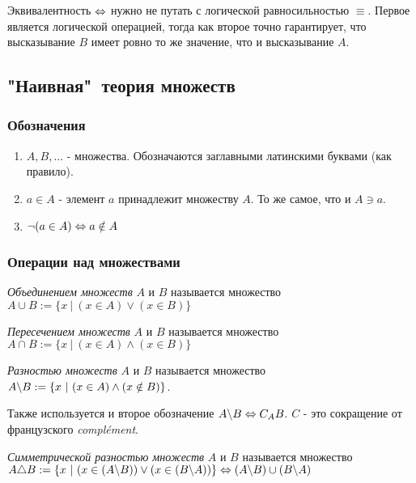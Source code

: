 Эквивалентность $\Leftrightarrow$ нужно не путать с логической равносильностью $\equiv$. Первое является логической операцией, тогда как второе точно гарантирует, что высказывание $B$ имеет ровно то же значение, что и высказывание $A$.


\subsection{"Наивная"\ теория множеств}

\subsubsection*{Обозначения}

\begin{enumerate}
    \item $A, B, \dots$ - множества. Обозначаются заглавными латинскими буквами (как правило).
    \item $a \in A$ - элемент $a$ принадлежит множеству $A$. То же самое, что и $A \ni a$.
    \item $\neg (a \in A) \Leftrightarrow a \notin A$
\end{enumerate}


\subsubsection*{Операции над множествами}

\begin{definition}
    \textit{Объединением множеств} $A$ и $B$ называется множество $A \cup B := \{x\ |\ (x \in A) \vee (x \in B)\}$
\end{definition}

\begin{definition}
    \textit{Пересечением множеств} $A$ и $B$ называется множество $A \cap B := \{x\ |\ (x \in A) \wedge (x \in B)\}$
\end{definition}

\begin{definition}
    \textit{Разностью множеств} $A$ и $B$ называется множество $A \backslash B := \{x\ |\ (x \in A) \wedge (x \notin B)\}$.
    
    Также используется и второе обозначение $A \backslash B \Leftrightarrow C_A B$. $C$ - это сокращение от французского \textit{complément}.
\end{definition}

\begin{definition}
    \textit{Симметрической разностью множеств} $A$ и $B$ называется множество $A \triangle B := \{x\ |\ (x \in (A \bs B)) \vee (x \in (B \bs A))\} \lra (A \bs B) \cup (B \bs A)$
\end{definition}

